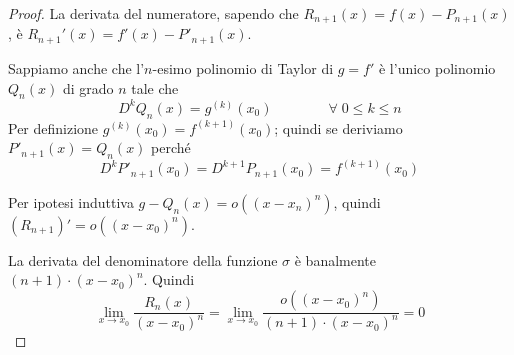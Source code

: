 \begin{proof}
La derivata del numeratore, sapendo che $R_{n+1}(x) = f(x)-P_{n+1}(x)$, è $R_{n+1}'(x) = f'(x) - P'_{n+1}(x)$. 

Sappiamo anche che l'$n$-esimo polinomio di Taylor di $g = f'$ è l'unico polinomio $Q_n(x)$ di grado $n$ tale che
\begin{equation*}
D^k Q_n(x) = g^{(k)} (x_0) \qquad \qquad \forall \; 0 \le k \le n
\end{equation*}
Per definizione $g^{(k)} (x_0) = f^{(k+1)}(x_0)$; quindi se deriviamo $P'_{n+1} (x) = Q_n(x)$ perché
\begin{equation*}
D^k P'_{n+1} (x_0) = D^{k+1} P_{n+1} (x_0) = f^{(k+1)} (x_0)
\end{equation*}

Per ipotesi induttiva $g-Q_n(x) = o((x-x_n)^n)$, quindi $(R_{n+1})' = o((x-x_0)^n)$.

La derivata del denominatore della funzione $\sigma$ è banalmente $(n+1) \cdot (x-x_0)^n$. Quindi
\begin{equation*}
\lim_{x \to x_0} \frac{R_n(x)}{(x-x_0)^n} = \lim_{x \to x_0} \frac{o((x-x_0)^n)}{(n+1) \cdot (x-x_0)^n} = 0
\end{equation*}
\end{proof}

